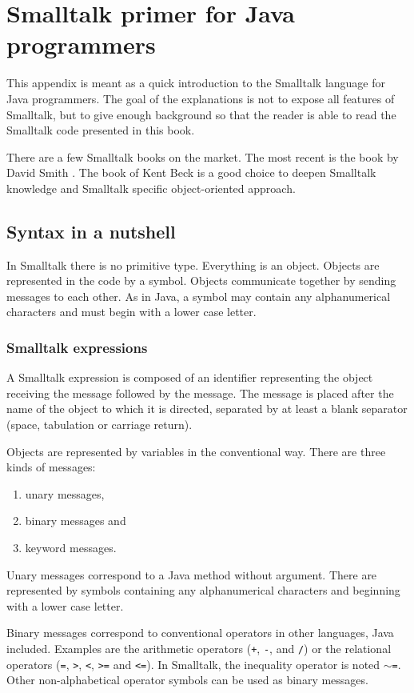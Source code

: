 \documentclass[twoside]{book}
\begin{document}
\fi

\chapter{Smalltalk primer for Java programmers}
\label{ch:smalltalkprimer}

This appendix is meant as a quick introduction to the Smalltalk
language for Java programmers. The goal of the explanations is not
to expose all features of Smalltalk, but to give enough background
so that the reader is able to read the Smalltalk code presented in
this book.

There are a few Smalltalk books on the market. The most recent is
the book by David Smith \cite{Smalltalk}. The book of Kent Beck
\cite{Beck} is a good choice to deepen Smalltalk knowledge and
Smalltalk specific object-oriented approach.

\section{Syntax in a nutshell}
In Smalltalk there is no primitive type. Everything is an object.
Objects are represented in the code by a symbol. Objects
communicate together by sending messages to each other. As in
Java, a symbol may contain any alphanumerical characters and must
begin with a lower case letter.

\subsection{Smalltalk expressions}
A Smalltalk expression is composed of an identifier representing
the object receiving the message followed by the message. The
message is placed after the name of the object to which it is
directed, separated by at least a blank separator (space,
tabulation or carriage return).

Objects are represented by variables in the conventional way.
There are three kinds of messages:
\begin{enumerate}
  \item unary messages,
  \item binary messages and
  \item keyword messages.
\end{enumerate}
Unary messages correspond to a Java method without argument. There
are represented by symbols containing any alphanumerical
characters and beginning with a lower case letter.

Binary messages correspond to conventional operators in other
languages, Java included. Examples are the arithmetic operators
({\tt +}, {\tt -}, {\tt *} and {\tt /}) or the relational
operators ({\tt =}, {\tt >}, {\tt <}, {\tt >=} and {\tt <=}). In
Smalltalk, the inequality operator is noted {\tt $\sim$=}. Other
non-alphabetical operator symbols can be used as binary messages.
\end{document}
